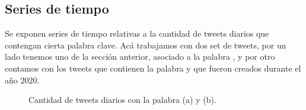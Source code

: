 \documentclass{article}
\begin{document}
\subsection{Series de tiempo}
Se exponen series de tiempo relativas a la cantidad de tweets diarios que contengan cierta palabra clave. Acá trabajamos con dos set de tweets, por un lado tenemos uno de la sección anterior, asociado a la palabra , y por otro contamos con los tweets que contienen la palabra  y que fueron creados durante el año $2020$.
\begin{figure}[H]
	\centering
	\caption{Cantidad de tweets diarios con la palabra  (a) y  (b).}
\end{figure}
\end{document}
